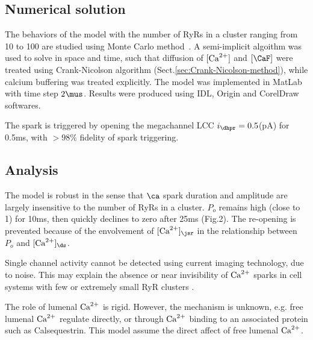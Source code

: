 \subsection{Numerical solution}
\label{sec:numerical-solutioin}

The behaviors of the model with the number of RyRs in a cluster ranging from 10
to 100 are studied using Monte Carlo method~\citep{rice1999mgg}.
A semi-implicit algoithm was used to solve in space and time, such that
diffusion of $[{\text{Ca}^{2+}}]$ and $[\CaF]$ were treated using Crank-Nicolson algorithm
(Sect.\ref{sec:Crank-Nicolson-method}),
while calcium buffering was treated explicitly. The model was implemented in
MatLab with time step $2\mus$. Results were produced using IDL, Origin and
CorelDraw softwares.


The spark is triggered by opening the megachannel LCC $i_\dhpr=0.5$(pA) for
0.5ms, with $>98\%$ fidelity of spark triggering.


\subsection{Analysis}
\label{sec:analysis-13}


The model is robust in the sense that $\ca$ spark duration and amplitude are
largely insensitive to the number of RyRs in a cluster. $P_o$ remains high
(close to 1) for 10ms, then quickly declines to zero after 25ms (Fig.2). The
re-opening is prevented because of the envolvement of $[\Ca]_\jsr$ in the
relationship between $P_o$ and $[\Ca]_\ds$.

Single channel activity cannot be detected using current imaging technology, due
to noise. This may explain the absence or near invisibility of ${\text{Ca}^{2+}}$ sparks in
cell systems with few or extremely small RyR clusters \citep{haak2001}.

The role of lumenal ${\text{Ca}^{2+}}$ is rigid. However, the mechanism is unknown, e.g.
free lumenal ${\text{Ca}^{2+}}$ regulate directly, or through ${\text{Ca}^{2+}}$ binding to an associated
protein such as Calsequestrin. This model assume the direct affect of free
lumenal ${\text{Ca}^{2+}}$.

